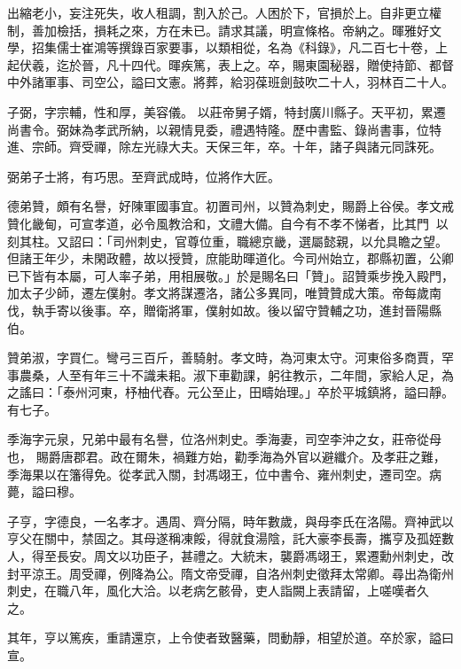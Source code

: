 \begin{pinyinscope}
 出縮老小，妄注死失，收人租調，割入於己。人困於下，官損於上。自非更立權制，善加檢括，損耗之來，方在未已。請求其議，明宣條格。帝納之。暉雅好文學，招集儒士崔鴻等撰錄百家要事，以類相從，名為《科錄》，凡二百七十卷，上起伏羲，迄於晉，凡十四代。暉疾篤，表上之。卒，賜東園秘器，贈使持節、都督中外諸軍事、司空公，謚曰文憲。將葬，給羽葆班劍鼓吹二十人，羽林百二十人。



 子弼，字宗輔，性和厚，美容儀。
 以莊帝舅子婿，特封廣川縣子。天平初，累遷尚書令。弼妹為孝武所納，以親情見委，禮遇特隆。歷中書監、錄尚書事，位特進、宗師。齊受禪，除左光祿大夫。天保三年，卒。十年，諸子與諸元同誅死。



 弼弟子士將，有巧思。至齊武成時，位將作大匠。



 德弟贊，頗有名譽，好陳軍國事宜。初置司州，以贊為刺史，賜爵上谷侯。孝文戒贊化畿甸，可宣孝道，必令風教洽和，文禮大備。自今有不孝不悌者，比其門，以刻其柱。又詔曰：「司州刺史，官尊位重，職總京畿，選屬懿親，以允具瞻之望。但諸王年少，未閑政體，故以授贊，庶能助暉道化。今司州始立，郡縣初置，公卿
 已下皆有本屬，可人率子弟，用相展敬。」於是賜名曰「贊」。詔贊乘步挽入殿門，加太子少師，遷左僕射。孝文將謀遷洛，諸公多異同，唯贊贊成大策。帝每歲南伐，執手寄以後事。卒，贈衛將軍，僕射如故。後以留守贊輔之功，進封晉陽縣伯。



 贊弟淑，字買仁。彎弓三百斤，善騎射。孝文時，為河東太守。河東俗多商賈，罕事農桑，人至有年三十不識耒耜。淑下車勸課，躬往教示，二年間，家給人足，為之謠曰：「泰州河東，杼柚代舂。元公至止，田疇始理。」卒於平城鎮將，謚曰靜。有七子。



 季海字元泉，兄弟中最有名譽，位洛州刺史。季海妻，司空李沖之女，莊帝從母也，
 賜爵唐郡君。政在爾朱，禍難方始，勸季海為外官以避纖介。及孝莊之難，季海果以在籓得免。從孝武入關，封馮翊王，位中書令、雍州刺史，遷司空。病薨，謚曰穆。



 子亨，字德良，一名孝才。遇周、齊分隔，時年數歲，與母李氏在洛陽。齊神武以亨父在關中，禁固之。其母遂稱凍餒，得就食湯陰，託大豪李長壽，攜亨及孤姪數人，得至長安。周文以功臣子，甚禮之。大統末，襲爵馮翊王，累遷勳州刺史，改封平涼王。周受禪，例降為公。隋文帝受禪，自洛州刺史徵拜太常卿。尋出為衛州刺史，在職八年，風化大洽。以老病乞骸骨，吏人詣闕上表請留，上嗟嘆者久
 之。



 其年，亨以篤疾，重請還京，上令使者致醫藥，問動靜，相望於道。卒於家，謚曰宣。




\end{pinyinscope}
